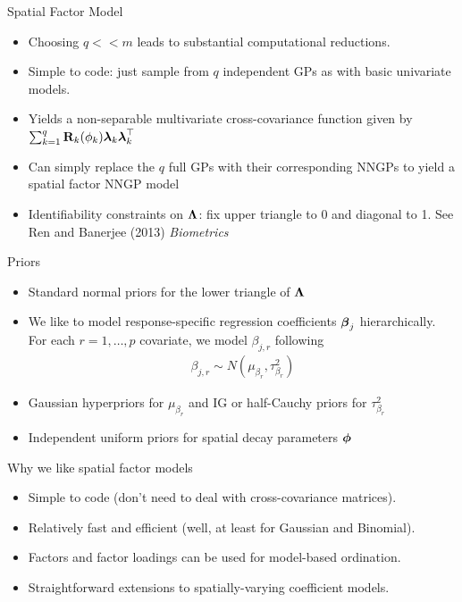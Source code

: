 \begin{frame}{Spatial Factor Model}
   \begin{itemize}
        \item Choosing $q << m$ leads to substantial computational reductions.
	\item Simple to code: just sample from $q$ independent GPs as with basic univariate models.
	\item Yields a non-separable multivariate cross-covariance function given by $\sum_{k = 1}^q\textbf{R}_k(\phi_k)\mbox{\boldmath $ \lambda $}_k\mbox{\boldmath $ \lambda $}_k^\top$
	\item Can simply replace the $q$ full GPs with their corresponding NNGPs to yield a spatial factor NNGP model
	\item Identifiability constraints on $\mbox{\boldmath $\Lambda$}$: fix upper triangle to 0 and diagonal to 1. See Ren and Banerjee (2013) \textit{Biometrics}
   \end{itemize}
\end{frame}

\begin{frame}{Priors}
    \begin{itemize}
	    \item Standard normal priors for the lower triangle of $\mbox{\boldmath $\Lambda$}$
	    \item We like to model response-specific regression coefficients $\mbox{\boldmath $ \beta $}_j$ hierarchically. For each $r = 1, \dots, p$ covariate, we model $\beta_{j, r}$ following
		    \begin{align*}
			    \beta_{j, r} \sim N(\mu_{\beta_r}, \tau^2_{\beta_r})
		    \end{align*}
	    \item Gaussian hyperpriors for $\mu_{\beta_r}$ and IG or half-Cauchy priors for $\tau^2_{\beta_r}$
	    \item Independent uniform priors for spatial decay parameters $\mbox{\boldmath $\phi$}$
    \end{itemize}
\end{frame}

\begin{frame}{Why we like spatial factor models}
    \begin{itemize}
         \item Simple to code (don't need to deal with cross-covariance matrices). \pause
	 \item Relatively fast and efficient (well, at least for Gaussian and Binomial). \pause
	 \item Factors and factor loadings can be used for model-based ordination. \pause
	 \item Straightforward extensions to spatially-varying coefficient models.
    \end{itemize}
\end{frame}

